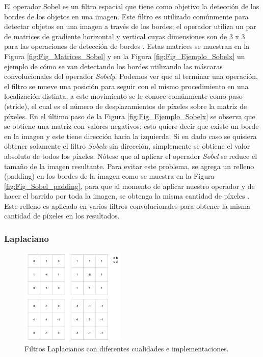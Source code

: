 \begin{onehalfspacing}
El operador Sobel es un filtro espacial que tiene como objetivo la detección de los bordes de los objetos en una imagen. Este filtro es utilizado comúnmente para detectar objetos en una imagen a través de los bordes; el operador utiliza un par de matrices de gradiente horizontal y vertical cuyas dimensiones son de 3 x 3 para las operaciones de detección de bordes \cite{Gupta2013SobelAlgorithm}. Estas matrices se muestran en la Figura \ref{fig:Fig_Matrices_Sobel} y en la Figura \ref{fig:Fig_Ejemplo_Sobelx} un ejemplo de cómo se van detectando los bordes utilizando las máscaras convolucionales del operador \textit{Sobely}. Podemos ver que al terminar una operación, el filtro se mueve una posición para seguir con el mismo procedimiento en una localización distinta; a este movimiento se le conoce comúnmente como paso (stride), el cual es el número de desplazamientos de píxeles sobre la matriz de píxeles. En el último paso de la Figura \ref{fig:Fig_Ejemplo_Sobelx} se observa que se obtiene una matriz con valores negativos; esto quiere decir que existe un borde en la imagen y este tiene dirección hacia la izquierda. Si en dado caso se quisiera obtener solamente el filtro \textit{Sobelx} sin dirección, simplemente se obtiene el valor absoluto de todos los píxeles.
Nótese que al aplicar el operador \textit{Sobel} se reduce el tamaño de la imagen resultante. Para evitar este problema, se agrega un relleno (padding) en los bordes de la imagen como se muestra en la Figura \ref{fig:Fig_Sobel_padding}, para que al momento de aplicar nuestro operador y de hacer el barrido por toda la imagen, se obtenga la misma cantidad de píxeles \cite{LaplacianEdgeFilter}. Este relleno es aplicado en varios filtros convolucionales para obtener la misma cantidad de píxeles en los resultados.


\subsubsection{Laplaciano}
\label{Laplaciano}

\begin{figure}[th]
	\centering
	\includegraphics[width=5cm,keepaspectratio]{XX_Figures/Fig_Filtros_Laplacianos.png}
	\caption{\footnotesize Filtros Laplacianos con diferentes cualidades e implementaciones.}
	\label{fig:fig_filtros_laplacianos}
\end{figure}


\end{onehalfspacing}

